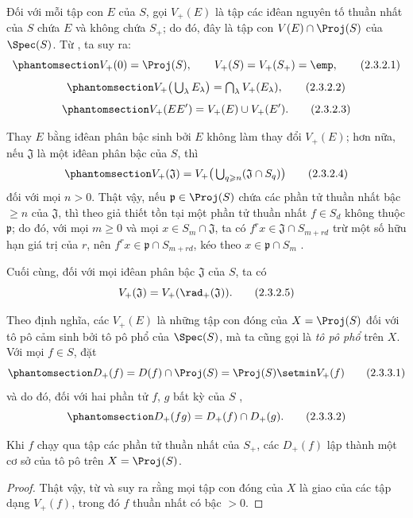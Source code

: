 \documentclass[oneside,10pt]{amsart}
\renewcommand{\geq}{\geqslant}
\newcommand{\oldpage}[2][]{\marginnote{\normalfont\footnotesize\textbf{#1}~|~#2}\ignorespaces}
\let\EGAOriginalLabel\label
\renewcommand{\label}[1]{\phantomsection\EGAOriginalLabel{#1}}
\begin{document}
\begin{env}[2.3.2]
\label{II.2.3.2}
Đối với mỗi tập con $E$ của $S$, gọi $V_+(E)$ là tập các iđêan nguyên tố thuần nhất của $S$ chứa $E$ và không chứa $S_+$; do đó, đây là tập con $V(E)\cap\Proj(S)$ của $\Spec(S)$.
Từ , ta suy ra:
\[
\label{II.2.3.2.1}
  V_+(0)=\Proj(S),\qquad V_+(S)=V_+(S_+)=\emp,
\tag{2.3.2.1}
\]
\[
\label{II.2.3.2.2}
  V_+\big(\textstyle\bigcup_\lambda E_\lambda\big)
  =\textstyle\bigcap_\lambda V_+(E_\lambda),
\tag{2.3.2.2}
\]
\[
\label{II.2.3.2.3}
  V_+(EE')=V_+(E)\cup V_+(E').
\tag{2.3.2.3}
\]

Thay $E$ bằng iđêan phân bậc sinh bởi $E$ không làm thay đổi $V_+(E)$; hơn nữa, nếu $\mathfrak{J}$ là một iđêan phân bậc của $S$, thì
\[
\label{II.2.3.2.4}
  V_+(\mathfrak{J})
  =V_+\big(\textstyle\bigcup_{q\geq n}(\mathfrak{J}\cap S_q)\big)
\tag{2.3.2.4}
\]
\oldpage[II]{26}
đối với mọi $n>0$.
Thật vậy, nếu $\mathfrak{p}\in\Proj(S)$ chứa các phần tử thuần nhất bậc $\geq n$ của $\mathfrak{J}$, thì theo giả thiết tồn tại một phần tử thuần nhất $f\in S_d$ không thuộc $\mathfrak{p}$; do đó, với mọi $m\geq0$ và mọi $x\in S_m\cap\mathfrak{J}$, ta có $f^rx\in\mathfrak{J}\cap S_{m+rd}$ trừ một số hữu hạn giá trị của $r$, nên $f^rx\in\mathfrak{p}\cap S_{m+rd}$, kéo theo $x\in\mathfrak{p}\cap S_m$ .

Cuối cùng, đối với mọi iđêan phân bậc $\mathfrak{J}$ của $S$, ta có
\[
  V_+(\mathfrak{J})=V_+(\rad_+(\mathfrak{J})).
\tag{2.3.2.5}
\]
\end{env}

\begin{env}[2.3.3]
\label{II.2.3.3}
Theo định nghĩa, các $V_+(E)$ là những tập con đóng của $X=\Proj(S)$ đối với tô pô cảm sinh bởi tô pô phổ của $\Spec(S)$, mà ta cũng gọi là \emph{tô pô phổ} trên $X$.
Với mọi $f\in S$, đặt
\[
\label{II.2.3.3.1}
  D_+(f)=D(f)\cap\Proj(S)=\Proj(S)\setmin V_+(f)
\tag{2.3.3.1}
\]
và do đó, đối với hai phần tử $f$, $g$ bất kỳ của $S$ ,
\[
\label{II.2.3.3.2}
  D_+(fg)=D_+(f)\cap D_+(g).
\tag{2.3.3.2}
\]
\end{env}

\begin{proposition}[2.3.4]
\label{II.2.3.4}
Khi $f$ chạy qua tập các phần tử thuần nhất của $S_+$, các $D_+(f)$ lập thành một cơ sở của tô pô trên $X=\Proj(S)$.
\end{proposition}

\begin{proof}
Thật vậy, từ  và  suy ra rằng mọi tập con đóng của $X$ là giao của các tập dạng $V_+(f)$, trong đó $f$ thuần nhất có bậc $>0$.
\end{proof}
\end{document}
